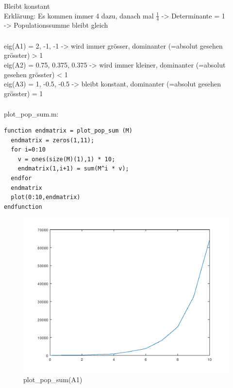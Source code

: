 \documentclass{article}
\begin{document}
\subsubsection{}
Bleibt konstant \\
Erklärung: Es kommen immer 4 dazu, danach mal $\frac{1}{4}$ -> Determinante = 1 \\ -> Populationssumme bleibt gleich
\subsubsection{}
eig(A1) = 2, -1, -1 -> wird immer grösser, dominanter (=absolut gesehen grösster) > 1 \\
eig(A2) = 0.75, 0.375, 0.375 -> wird immer kleiner, dominanter (=absolut gesehen grösster) < 1 \\
eig(A3) = 1, -0.5, -0.5 -> bleibt konstant, dominanter (=absolut gesehen grösster) = 1 \\
\subsubsection{}
plot\_pop\_sum.m:
\begin{lstlisting}
function endmatrix = plot_pop_sum (M)
  endmatrix = zeros(1,11);
  for i=0:10
    v = ones(size(M)(1),1) * 10;
    endmatrix(1,i+1) = sum(M^i * v);
  endfor
  endmatrix
  plot(0:10,endmatrix)
endfunction
\end{lstlisting}

\begin{figure}[H]
\centering
\includegraphics[scale=0.6]{plotA1.png}
\caption{plot\_pop\_sum(A1)}
\label{fig:universe}
\end{figure}
\end{document}
